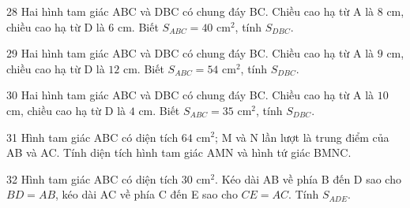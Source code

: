 \gap
\begin{probbox}{28}{\relax}
Hai hình tam giác ABC và DBC có chung đáy BC. Chiều cao hạ từ A là $8$ cm, chiều cao hạ từ D là $6$ cm. Biết $S_{ABC}=40$ cm$^2$, tính $S_{DBC}$.
\end{probbox}
\gap
\begin{probbox}{29}{\relax}
Hai hình tam giác ABC và DBC có chung đáy BC. Chiều cao hạ từ A là $9$ cm, chiều cao hạ từ D là $12$ cm. Biết $S_{ABC}=54$ cm$^2$, tính $S_{DBC}$.
\end{probbox}
\gap
\begin{probbox}{30}{\relax}
Hai hình tam giác ABC và DBC có chung đáy BC. Chiều cao hạ từ A là $10$ cm, chiều cao hạ từ D là $4$ cm. Biết $S_{ABC}=35$ cm$^2$, tính $S_{DBC}$.
\end{probbox}
\begin{probbox}{31}{}
Hình tam giác ABC có diện tích $64$ cm$^2$; M và N lần lượt là trung điểm của AB và AC. Tính diện tích hình tam giác AMN và hình tứ giác BMNC.
\end{probbox}
\gap
\begin{probbox}{32}{}
Hình tam giác ABC có diện tích $30$ cm$^2$. Kéo dài AB về phía B đến D sao cho $BD=AB$, kéo dài AC về phía C đến E sao cho $CE=AC$. Tính $S_{ADE}$.
\end{probbox}
